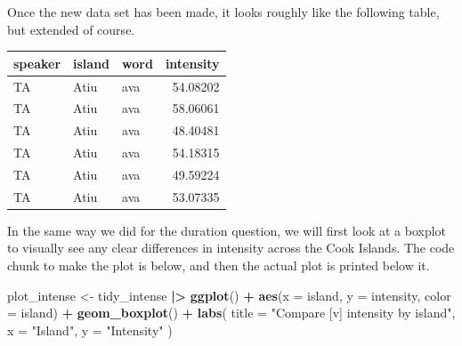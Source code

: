 \documentclass[
  ,man,floatsintext]{apa6}
\newenvironment{Shaded}{\begin{snugshade}}{\end{snugshade}}
\newcommand{\AttributeTok}[1]{\textcolor[rgb]{0.13,0.29,0.53}{#1}}
\newcommand{\FunctionTok}[1]{\textcolor[rgb]{0.13,0.29,0.53}{\textbf{#1}}}
\newcommand{\NormalTok}[1]{#1}
\newcommand{\OtherTok}[1]{\textcolor[rgb]{0.56,0.35,0.01}{#1}}
\newcommand{\SpecialCharTok}[1]{\textcolor[rgb]{0.81,0.36,0.00}{\textbf{#1}}}
\newcommand{\StringTok}[1]{\textcolor[rgb]{0.31,0.60,0.02}{#1}}
\begin{document}
Once the new data set has been made, it looks roughly like the following table, but extended of course.

\begin{tabular}{l|l|l|r}
\hline
speaker & island & word & intensity\\
\hline
TA & Atiu & ava & 54.08202\\
\hline
TA & Atiu & ava & 58.06061\\
\hline
TA & Atiu & ava & 48.40481\\
\hline
TA & Atiu & ava & 54.18315\\
\hline
TA & Atiu & ava & 49.59224\\
\hline
TA & Atiu & ava & 53.07335\\
\hline
\end{tabular}

In the same way we did for the duration question, we will first look at a boxplot to visually see any clear differences in intensity across the Cook Islands. The code chunk to make the plot is below, and then the actual plot is printed below it.

\begin{Shaded}
\begin{Highlighting}[]
\NormalTok{plot\_intense }\OtherTok{\textless{}{-}}\NormalTok{ tidy\_intense }\SpecialCharTok{|\textgreater{}}
  \FunctionTok{ggplot}\NormalTok{() }\SpecialCharTok{+}
  \FunctionTok{aes}\NormalTok{(}\AttributeTok{x =}\NormalTok{ island, }\AttributeTok{y =}\NormalTok{ intensity, }\AttributeTok{color =}\NormalTok{ island) }\SpecialCharTok{+}
  \FunctionTok{geom\_boxplot}\NormalTok{() }\SpecialCharTok{+}
  \FunctionTok{labs}\NormalTok{(}
    \AttributeTok{title =} \StringTok{"Compare [v] intensity by island"}\NormalTok{,}
    \AttributeTok{x =} \StringTok{"Island"}\NormalTok{,}
    \AttributeTok{y =} \StringTok{"Intensity"}
\NormalTok{  ) }
\end{Highlighting}
\end{Shaded}
\end{document}

